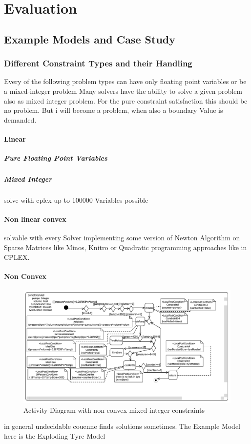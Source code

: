 \chapter{Evaluation}
\label{chap:evaluation}
\section{Example Models and Case Study}
\subsection{Different Constraint Types and their Handling}
\label{sec:evaluationAcademicModels}
Every of the following problem types can have only floating point variables or be a mixed-integer problem
Many solvers have the ability to solve a given problem also as mixed integer problem. For the pure constraint satisfaction this should be no problem. But i will become a problem, when also a boundary Value is demanded.
\subsubsection{Linear}
\paragraph{Pure Floating Point Variables}
\paragraph{Mixed Integer}
solve with cplex up to 100000 Variables possible
\subsubsection{Non linear convex}
solvable with every Solver implementing some version of Newton Algorithm on Sparse Matrices like Minos, Knitro or Quadratic programming approaches like in CPLEX.
\subsubsection{Non Convex}
\label{sec:exampleModelNonConvex}
\begin{figure}
\label{fig:pumpTyre}
\includegraphics[width=\textwidth]{./pics/pumpTyre.pdf}
\caption{Activity Diagram with non convex mixed integer constraints}
\end{figure}
in general undecidable couenne finds solutions sometimes.
The Example Model here is the Exploding Tyre Model
